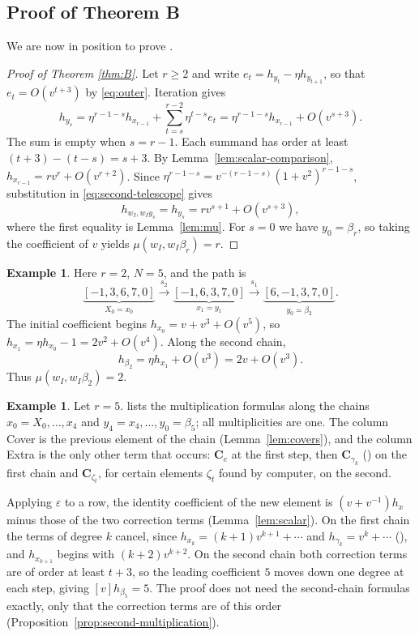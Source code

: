 \documentclass[11pt,a4paper,reqno]{amsart}
\numberwithin{equation}{section}
\theoremstyle{definition}
\newtheorem{example}[theorem]{Example}
\theoremstyle{remark}
\theoremstyle{plain}
\newcommand{\C}{\mathbf C}
\newcommand{\eps}{\varepsilon}
\begin{document}
\subsection{Proof of Theorem B}\label{sec:scalarfinish}
We are now in position to prove .

\begin{proof}[Proof of Theorem \ref{thm:B}]
Let $r\geq2$ and write $e_t=h_{y_t}-\eta h_{y_{t+1}}$, so that
$e_t=O(v^{t+3})$ by \eqref{eq:outer}. Iteration gives
\begin{equation}\label{eq:second-telescope}
 h_{y_s}=\eta^{r-1-s}h_{x_{r-1}}
       +\sum_{t=s}^{r-2}\eta^{t-s}e_t
     =\eta^{r-1-s}h_{x_{r-1}}+O(v^{s+3}).
\end{equation}
The sum is empty when $s=r-1$. Each summand has order at least
$(t+3)-(t-s)=s+3$. By Lemma~\ref{lem:scalar-comparison},
$h_{x_{r-1}}=rv^r+O(v^{r+2})$. Since
$\eta^{r-1-s}=v^{-(r-1-s)}(1+v^2)^{r-1-s}$, substitution in
\eqref{eq:second-telescope} gives
\[
 h_{w_I,w_Iy_s}=h_{y_s}=rv^{s+1}+O(v^{s+3}),
\]
where the first equality is Lemma~\ref{lem:mu}. For $s=0$ we have
$y_0=\beta_r$, so taking the coefficient of $v$ yields
$\mu(w_I,w_I\beta_r)=r$.
\end{proof}

{\color{black}
\begin{example}\label{ex:mu-A4}
Here $r=2$, $N=5$, and the path is
\[
 \underbrace{[-1,3,6,7,0]}_{X_0=x_0}\xrightarrow{s_2}\underbrace{[-1,6,3,7,0]}_{x_1=y_1}
 \xrightarrow{s_1}\underbrace{[6,-1,3,7,0]}_{y_0=\beta_2}.
\]
The initial coefficient begins $h_{x_{0}}=v+v^3+O(v^5)$, so
$h_{x_1}=\eta h_{x_0}-1=2v^2+O(v^4)$. Along the second chain,
\[
 h_{\beta_2}=\eta h_{x_1}+O(v^3)=2v+O(v^3).
\]
Thus $\mu(w_I,w_I\beta_2)=2$.
\end{example}
}
\begin{example}\label{rex:roadmap}
Let $r=5$.  lists the multiplication formulas along the
chains $x_0=X_0,\ldots,x_4$ and $y_4=x_4,\ldots,y_0=\beta_5$; all
multiplicities are one. The column Cover is the previous element of the
chain (Lemma~\ref{lem:covers}), and the column Extra is the only other
term that occurs: $\C_e$ at the first step, then $\C_{\gamma_k}$
() on the first chain and $\C_{\zeta_t}$, for certain
elements $\zeta_t$ found by computer, on the second.

Applying $\eps$ to a row, the identity coefficient of the new element is
$(v+v^{-1}) h_x$ minus those of the two correction terms (Lemma~\ref{lem:scalar}).
On the first chain the terms of degree $k$ cancel, since
$h_{x_k}=(k+1)v^{k+1}+\cdots$ and $h_{\gamma_k}=v^k+\cdots$ (), and
$h_{x_{k+1}}$ begins with $(k+2)v^{k+2}$. 
On the second chain both
correction terms are of order at least $t+3$, so the leading coefficient
$5$ moves down one degree at each step, giving $[v]h_{\beta_5}=5$. The
proof does not need the second-chain formulas exactly, only that the
correction terms are of this order
(Proposition~\ref{prop:second-multiplication}). 
\end{example}
\end{document}
